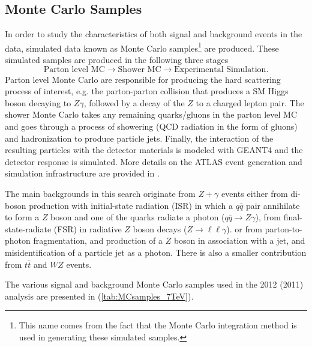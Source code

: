 \subsection{Monte Carlo Samples}
\label{subsec:mc}
In order to study the characteristics of both signal and background events 
in the data, simulated data known as Monte Carlo samples\footnote{This name
comes from the fact that the Monte Carlo integration method is used in generating
these simulated samples.} are produced. These simulated samples are produced
in the following three stages
\[
    \text{Parton level MC} \rightarrow \text{Shower MC} 
    \rightarrow \text{Experimental Simulation}.
\]
Parton level Monte Carlo are responsible for producing the hard scattering process
of interest, e.g. the parton-parton collision that produces a SM 
Higgs boson decaying to $Z\gamma$, followed by a decay of the $Z$ to 
a charged lepton pair. The shower Monte Carlo takes
any remaining quarks/gluons in the parton level MC and goes 
through a process of showering (QCD radiation in the form of gluons) and
hadronization to produce particle jets. Finally, the interaction of the resulting
particles with the detector materials is modeled with GEANT4 \cite{geant} and
the detector response is simulated. More details on the ATLAS event generation and
simulation infrastructure are provided in \cite{ATLASsimulation}.

The main backgrounds in this search originate from $Z+\gamma$ events either
from di-boson production with initial-state radiation (ISR)
in which a $q\bar q$ pair annihilate to form a $Z$ boson and one of the 
quarks radiate a photon ($q\bar q \to Z\gamma$), 
from final-state-radiate (FSR) in radiative $Z$ boson decays 
($Z \to \ell\ell\gamma$). or from parton-to-photon fragmentation, and production
of a $Z$ boson in association with a jet, and misidentification of a particle
jet as a photon. There is also a smaller contribution from  $t\bar t$ and $WZ$
events.

The various signal and background Monte Carlo samples used in the 2012 (2011) 
analysis are presented in  (\ref{tab:MCsamples_7TeV}).


